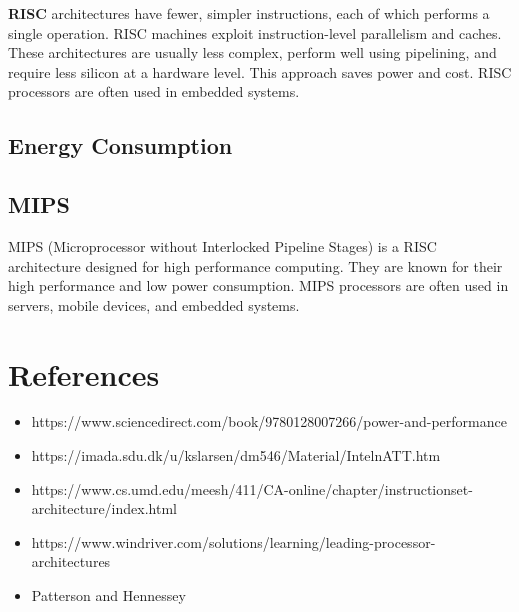 \textbf{RISC} architectures have fewer, simpler instructions, each of which performs a single operation. RISC machines exploit instruction-level parallelism and caches. These architectures are usually less complex, perform well using pipelining, and require less silicon at a hardware level. This approach saves power and cost. RISC processors are often used in embedded systems.

\subsection{Energy Consumption}

\subsection{MIPS}

MIPS (Microprocessor without Interlocked Pipeline Stages) is a RISC architecture designed for high performance computing. They are known for their high performance and low power consumption. MIPS processors are often used in servers, mobile devices, and embedded systems.

\section{References}

\begin{itemize}
	\item https://www.sciencedirect.com/book/9780128007266/power-and-performance
	\item https://imada.sdu.dk/u/kslarsen/dm546/Material/IntelnATT.htm
	\item https://www.cs.umd.edu/meesh/411/CA-online/chapter/instructionset-
	architecture/index.html
	\item https://www.windriver.com/solutions/learning/leading-processor-architectures
	\item Patterson and Hennessey
\end{itemize}